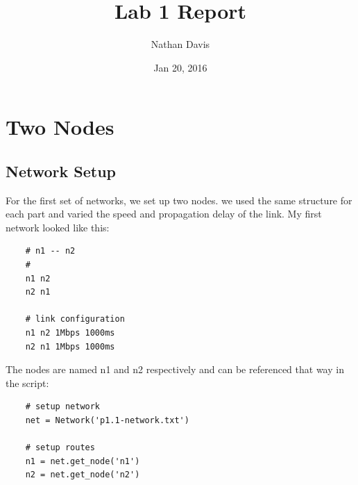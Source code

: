 \documentclass[11pt]{article}
\begin{document}
\lstset{
  language=Python,
  basicstyle=\small,          %
  keywordstyle=\bfseries,
  identifierstyle=,           %
  commentstyle=,              %
  stringstyle=\ttfamily,      %
  showstringspaces=false,     %
  numbers=left,
  numberstyle=\tiny,
  numbersep=5pt,
  frame=tb,
}

\title{Lab 1 Report}

\author{Nathan Davis}

\date{Jan 20, 2016}

\maketitle

\section{Two Nodes}

\subsection{Network Setup}

For the first set of networks, we set up two nodes. we used the same structure for each part and varied the speed and propagation delay of the link. My first network looked like this:

\vspace{5mm}

\begin{lstlisting}
    # n1 -- n2
    #
    n1 n2
    n2 n1

    # link configuration
    n1 n2 1Mbps 1000ms
    n2 n1 1Mbps 1000ms
\end{lstlisting}

\vspace{5mm}

The nodes are named n1 and n2 respectively and can be referenced that way in the script:

\vspace{5mm}

\begin{lstlisting}
    # setup network
    net = Network('p1.1-network.txt')

    # setup routes
    n1 = net.get_node('n1')
    n2 = net.get_node('n2')
\end{lstlisting}

\vspace{5mm}
\end{document}
